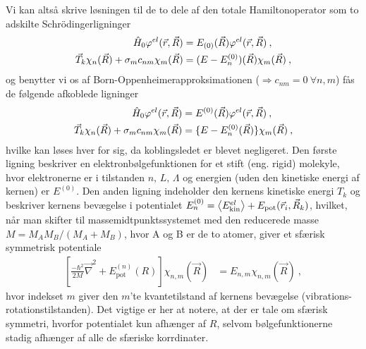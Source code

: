 Vi kan altså skrive løsningen til de to dele af den totale Hamiltonoperator som to adskilte Schrödingerligninger
\begin{align}
    \Hat{H}_0 \phi^{el}(\Vec{r}, \Vec{R}) &= E_{(0)}(\Vec{R})\phi^{el}(\Vec{r}, \Vec{R}) \: , \\
    \Vec{T}_k \chi_n(\Vec{R}) + \sigma_m c_{nm} \chi_m(\Vec{R}) &= (E - E_n^{(0)})(\Vec{R}) \chi_m(\Vec{R}) \: ,
\end{align}
og benytter vi os af Born-Oppenheimerapproksimationen ($\Rightarrow c_{nm} = 0 \: \forall n,m$) fås de følgende afkoblede ligninger
\begin{align}
    \Hat{H}_0 \phi^{el}(\Vec{r}, \Vec{R}) &= E^{(0)}(\Vec{R})\phi^{el}(\Vec{r}, \Vec{R}) \: , \\
    \Vec{T}_k \chi_n(\Vec{R}) + \sigma_m c_{nm} \chi_m(\Vec{R}) &= \{E - E_n^{(0)}(\Vec{R})\} \chi_m(\Vec{R}) \: ,
\end{align}
hvilke kan løses hver for sig, da koblingsledet er blevet negligeret.
Den første ligning beskriver en elektronbølgefunktionen for et stift (eng. rigid) molekyle, hvor elektronerne er i tilstanden $n,\, L,\, \Lambda$ og energien (uden den kinetiske energi af kernen) er $E^{(0)}$. Den anden ligning indeholder den kernens kinetiske energi $T_k$ og beskriver kernens bevægelse i potentialet $E_n^{(0)} = \braket{E_\text{kin}^{el}} + E_\text{pot}(\Vec{r}_i, \Vec{R}_k)$, hvilket, når man skifter til massemidtpunktssystemet med den reducerede masse $M = M_A M_B / (M_A + M_B)$, hvor A og B er de to atomer, giver et sfærisk symmetrisk potentiale
\begin{align} \label{eq:Q20_EquationWithSphericalSymmetricPotential}
    \left[\frac{-\hbar^2}{2M}\Vec{\nabla}^2 + E_\text{pot}^(n)(R)\right] \chi_{n,m}(\Vec{R}) &= E_{n,m}\chi_{n,m}(\Vec{R}) \: ,
\end{align}
hvor indekset $m$ giver den $m$'te kvantetilstand af kernens bevægelse (vibrations-rotationstilstanden). Det vigtige er her at notere, at der er tale om sfærisk symmetri, hvorfor potentialet kun afhænger af $R$, selvom bølgefunktionerne stadig afhænger af alle de sfæriske korrdinater.

